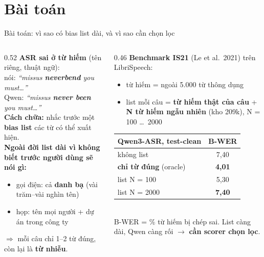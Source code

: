 \documentclass[aspectratio=169,xcolor=table]{beamer}
\newcommand{\hi}[1]{\textcolor{Primary}{\textbf{#1}}}
\newcommand{\bad}[1]{\textcolor{RiskRed}{\textbf{#1}}}
\newcommand{\good}[1]{\textcolor{GoodGreen}{\textbf{#1}}}
\begin{document}
\section{Bài toán}
\begin{frame}{Bài toán: vì sao có bias list dài, và vì sao cần chọn lọc}
\begin{columns}[T]
\begin{column}{0.52\textwidth}
\small
\textbf{ASR sai ở từ hiếm} (tên riêng, thuật ngữ):\\[2pt]
\quad nói: \emph{``missus \textbf{neverbend} you must\dots''}\\
\quad Qwen: \emph{``missus \bad{never been} you must\dots''}\\[6pt]
\textbf{Cách chữa:} nhắc trước một \hi{bias list} các từ có thể xuất hiện.\\[6pt]
\textbf{Ngoài đời list dài vì không biết trước người dùng sẽ nói gì:}
\begin{itemize}\itemsep1pt
\item gọi điện: cả \textbf{danh bạ} (vài trăm--vài nghìn tên)
\item họp: tên mọi người + dự án trong công ty
\end{itemize}
$\Rightarrow$ mỗi câu chỉ 1--2 từ đúng, còn lại là \textbf{từ nhiễu}.
\end{column}
\begin{column}{0.46\textwidth}
\small
\textbf{Benchmark IS21} (Le et al.\ 2021) trên LibriSpeech:
\begin{itemize}\itemsep1pt
\item từ hiếm = ngoài 5.000 từ thông dụng
\item list mỗi câu = \good{từ hiếm thật của câu} + \bad{N từ hiếm ngẫu nhiên} (kho 209k), N = 100 \dots\ 2000
\end{itemize}
\vspace{2pt}
\renewcommand{\arraystretch}{1.15}
\begin{tabular}{@{}lc@{}}
\toprule
Qwen3-ASR, test-clean & B-WER\\
\midrule
không list & 7,40\\
\good{chỉ từ đúng} (oracle) & \good{4,01}\\
list N = 100 & 5,30\\
list N = 2000 & \bad{7,40}\\
\bottomrule
\end{tabular}\\[3pt]
\footnotesize B-WER = \% từ hiếm bị chép sai. List càng dài, Qwen càng rối $\rightarrow$ \hi{cần scorer chọn lọc}.
\end{column}
\end{columns}
\end{frame}
\end{document}
